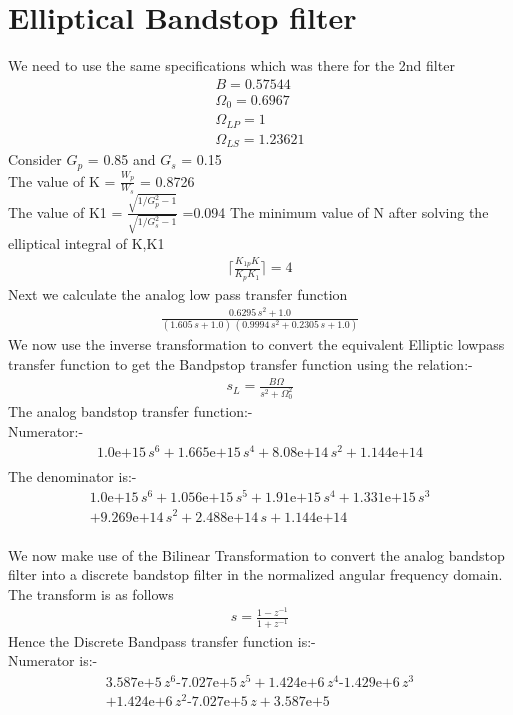 \documentclass[12pt, letterpaper,]{article}
\begin{document}
\section{Elliptical Bandstop filter}
We need to use the same specifications which was there for the 2nd filter
\begin{align*}
    B = 0.57544\\
    \Omega_0 = 0.6967\\
    \Omega_{LP} = 1\\
    \Omega_{LS} = 1.23621
\end{align*}
Consider $G_p$ = 0.85 and $G_s$ = 0.15\\
The value of K = $\frac{W_p}{W_s}$ = 0.8726\\
The value of K1 = $\frac{\sqrt{1/G_p^2-1}}{\sqrt{1/G_s^2-1}}$ =0.094
The minimum value of N after solving the elliptical integral of K,K1\\
\begin{align*}
    \lceil \frac{K_{1p}K}{K_pK_1}\rceil = 4
\end{align*}
Next we calculate the analog low pass transfer function\\
\begin{align*}
\frac{0.6295\,s^2 +1.0}{{\left(1.605\,s+1.0\right)}\,{\left(0.9994\,s^2 +0.2305\,s+1.0\right)}}
\end{align*}
We now use the inverse transformation to convert the equivalent Elliptic lowpass
transfer function to get the Bandpstop transfer function using the relation:-
\begin{align*}
    s_L = \frac{B\Omega}{s^2+\Omega_0^2}
\end{align*}
The analog bandstop transfer function:-\\
Numerator:-\\
\begin{align*}
    \text{1.0e+15}\,s^6 +\text{1.665e+15}\,s^4 +\text{8.08e+14}\,s^2 +\text{1.144e+14}\\
\end{align*}
The denominator is:-\\
\begin{align*}
\text{1.0e+15}\,s^6 +\text{1.056e+15}\,s^5 +\text{1.91e+15}\,s^4 +\text{1.331e+15}\,s^3\\ +\text{9.269e+14}\,s^2 +\text{2.488e+14}\,s +\text{1.144e+14}\\
\end{align*}

We now make use of the Bilinear Transformation to convert the analog bandstop
filter into a discrete bandstop filter in the normalized angular frequency domain. The transform is as follows
\begin{align*}
    s = \frac{1-z^{-1}}{1+z^{-1}}
\end{align*}
Hence the Discrete Bandpass transfer function is:-\\
Numerator is:-
\begin{align*}
\text{3.587e+5}\,z^6 \text{-7.027e+5}\,z^5 +\text{1.424e+6}\,z^4 \text{-1.429e+6}\,z^3\\ +\text{1.424e+6}\,z^2 \text{-7.027e+5}\,z +\text{3.587e+5}\\
\end{align*}  
\end{document}

